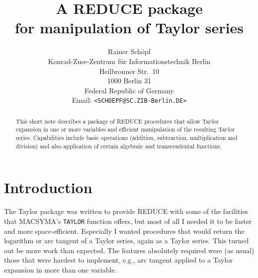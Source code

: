 
\newcommand{\REDUCE}{{\sf REDUCE}}
\newcommand{\MACSYMA}{{\sf MACSYMA}}
\newcommand{\MAPLE}{{\sf MAPLE}}
\newcommand{\Mathematica}{{\sf Mathematica}}
\newcommand{\PSL}{{\sf PSL}}
\renewcommand{\today}{October 5, 1990}

%
%



\title{A \REDUCE{} package\\
       for manipulation of Taylor series}

\author{Rainer Sch\"opf\\
        Konrad-Zuse-Zentrum f\"ur Informationstechnik Berlin\\
        Heilbronner Str.\ 10\\
        1000 Berlin 31\\
        Federal Republic of Germany\\
        Email: \verb|<SCHOEPF@SC.ZIB-Berlin.DE>|}

\maketitle

\begin{abstract}
  This short note describes a package of \REDUCE{} procedures
  that allow Taylor expansion in one or more variables and efficient
  manipulation of the resulting Taylor series. Capabilities include
  basic operations (addition, subtraction, multiplication
  and division) and also application of certain algebraic and 
  transcendental functions.
\end{abstract}

\section{Introduction}

The Taylor package was written to provide \REDUCE{} with some of
the facilities
that \MACSYMA's \verb+TAYLOR+ function offers,
but most of all I needed it to be faster and
more space-efficient.
Especially I wanted procedures that would return the logarithm or
arc tangent of a Taylor series, again as a Taylor series.
This turned out be more work than expected. The features absolutely
required were (as usual) those that were hardest to implement,
e.g., arc tangent applied to a Taylor expansion in more than
one variable.

